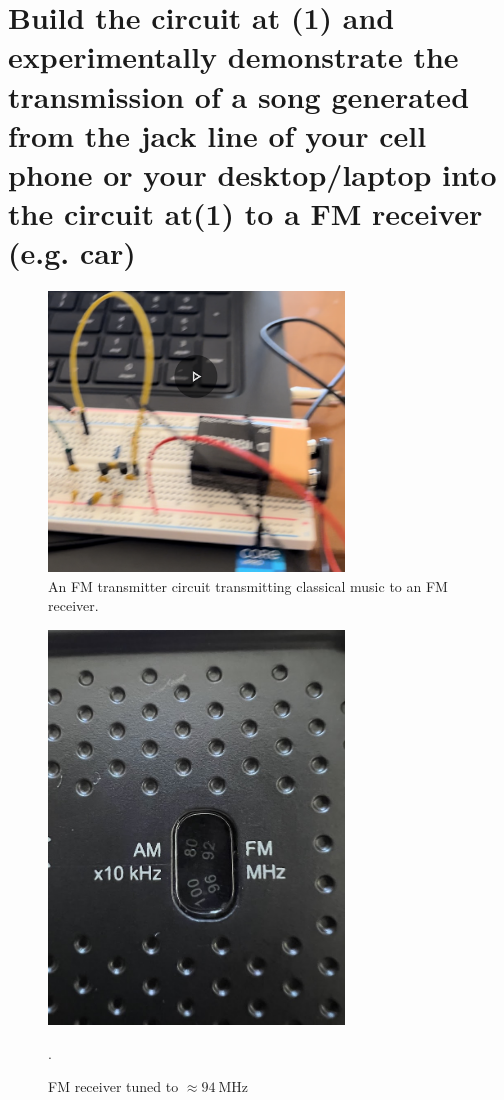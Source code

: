 \documentclass{article}
\begin{document}
	\section{Build the circuit at (1) and experimentally demonstrate the transmission of a song generated from the
jack line of your cell phone or your desktop/laptop into the circuit at(1) to a FM receiver (e.g. car)}
	
	\begin{figure}[H]
	    \centering
	    \includegraphics[width=0.7\textwidth]{song}
	    \caption{An FM transmitter circuit transmitting classical music to an FM receiver.}
	\end{figure}
	
	\begin{figure}[H]
	    \centering
	    \includegraphics[width=0.7\textwidth]{freq}
	    \caption{FM receiver tuned to $\approx\SI{94}{\MHz}$}.
	\end{figure}
\end{document}
